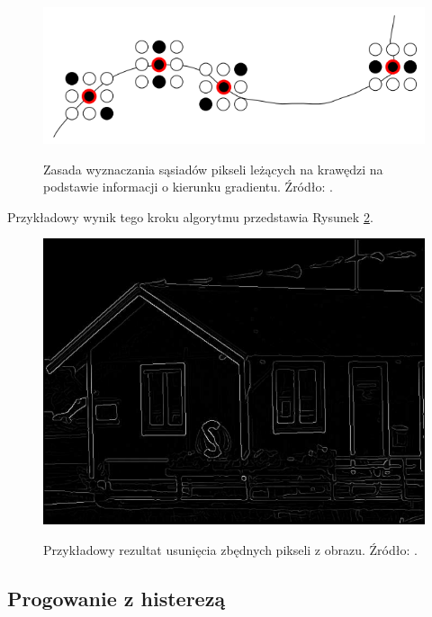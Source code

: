 \documentclass[a4paper,twocolumn,12pt]{article}
\begin{document}
\begin{figure}[!ht]
 \begin{center}
  \scalebox{0.45}
  {
   \includegraphics{../obrazki/canny/3_1_piksele.png}
  }
 \end{center}
 \caption{
  Zasada wyznaczania sąsiadów pikseli leżących na krawędzi na podstawie informacji o kierunku gradientu.
  Źródło: \cite{boldak}.
 }
 \label{fig:canny_adjacent_pixels}
\end{figure}

Przykładowy wynik tego kroku algorytmu przedstawia Rysunek \ref{fig:canny_redundant_pixels_removal}.

\begin{figure}[!ht]
 \begin{center}
  \scalebox{0.25}
  {
   \includegraphics{../obrazki/canny/3_2_krawedzie.png}
  }
 \end{center}
 \caption{
  Przykładowy rezultat usunięcia zbędnych pikseli z obrazu.
  Źródło: \cite{boldak}.
 }
 \label{fig:canny_redundant_pixels_removal}
\end{figure}


\subsection{Progowanie z histerezą}
\end{document}
